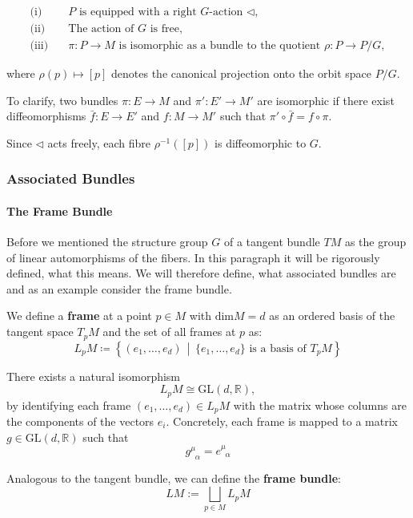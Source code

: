 \begin{align*}
  \text{(i)}\quad & P \text{ is equipped with a right } G\text{-action } \triangleleft, \\
  \text{(ii)}\quad & \text{The action of } G \text{ is free}, \\
  \text{(iii)}\quad & \pi : P \to M \text{ is isomorphic as a bundle to the quotient } \rho : P \to P/G,
\end{align*}

where \( \rho(p) \mapsto [p] \) denotes the canonical projection onto the orbit space \( P/G \). 

To clarify, two bundles \( \pi: E \to M \) and \( \pi': E' \to M' \) are isomorphic if there exist diffeomorphisms \( \bar{f}: E \to E' \) and \( f: M \to M' \) such that \( \pi' \circ \bar{f} = f \circ \pi \).

Since \( \triangleleft \) acts freely, each fibre \( \rho^{-1}([p]) \) is diffeomorphic to \(G\).


\subsubsection{Associated Bundles}
\paragraph{The Frame Bundle}

Before we mentioned the structure group \( G \) of a tangent bundle \( TM \) as the group of linear automorphisms of the fibers. In this paragraph it will be rigorously defined, what this means. We will therefore define, what associated bundles are and as an example consider the frame bundle.

We define a \textbf{frame} at a point \(p\in M\) with \(\text{dim} M = d\) as an ordered basis of the tangent space \(T_pM\) and the set  of all frames at \(p\) as:
\[
L_pM \coloneqq \left\{ (e_1, \dots, e_d) \,\middle|\, \{e_1, \dots, e_d\} \text{ is a basis of } T_pM \right\}
\]

There exists a natural isomorphism
\[
L_pM \cong \mathrm{GL}(d, \mathbb{R}),
\]
by identifying each frame \( (e_1, \dots, e_d) \in L_pM \) with the matrix whose columns are the components of the vectors \( e_i \). Concretely, each frame is mapped to a matrix \( g \in \mathrm{GL}(d, \mathbb{R}) \) such that
\[
g^\mu_{\;\;\alpha} = e^\mu_{\;\;\alpha}
\]



Analogous to the tangent bundle, we can define the \textbf{frame bundle}:
\[ LM := \bigsqcup_{p \in M} L_pM \]


